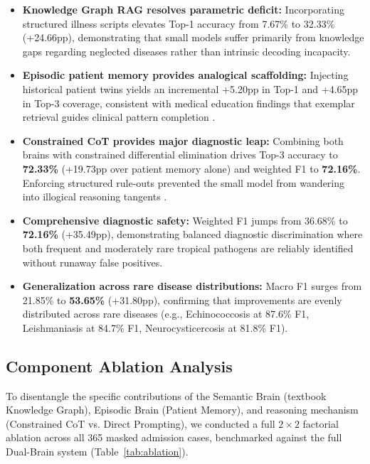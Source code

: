 \documentclass{article}
\begin{document}
\begin{itemize}[noitemsep, leftmargin=*]
    \item \textbf{Knowledge Graph RAG resolves parametric deficit:} Incorporating structured illness scripts elevates Top-1 accuracy from 7.67\% to 32.33\% (+24.66pp), demonstrating that small models suffer primarily from knowledge gaps regarding neglected diseases rather than intrinsic decoding incapacity.
    \item \textbf{Episodic patient memory provides analogical scaffolding:} Injecting historical patient twins yields an incremental +5.20pp in Top-1 and +4.65pp in Top-3 coverage, consistent with medical education findings that exemplar retrieval guides clinical pattern completion \citep{schmidt1990cognitive,bowen2006educational}.
    \item \textbf{Constrained CoT provides major diagnostic leap:} Combining both brains with constrained differential elimination drives Top-3 accuracy to \textbf{72.33\%} (+19.73pp over patient memory alone) and weighted F1 to \textbf{72.16\%}. Enforcing structured rule-outs prevented the small model from wandering into illogical reasoning tangents \citep{wei2022chain,renze2024benefits}.
    \item \textbf{Comprehensive diagnostic safety:} Weighted F1 jumps from 36.68\% to \textbf{72.16\%} (+35.49pp), demonstrating balanced diagnostic discrimination where both frequent and moderately rare tropical pathogens are reliably identified without runaway false positives.
    \item \textbf{Generalization across rare disease distributions:} Macro F1 surges from 21.85\% to \textbf{53.65\%} (+31.80pp), confirming that improvements are evenly distributed across rare diseases (e.g., Echinococcosis at 87.6\% F1, Leishmaniasis at 84.7\% F1, Neurocysticercosis at 81.8\% F1).
\end{itemize}

\subsection{Component Ablation Analysis}
\label{sec:ablation}

To disentangle the specific contributions of the Semantic Brain (textbook Knowledge Graph), Episodic Brain (Patient Memory), and reasoning mechanism (Constrained CoT vs. Direct Prompting), we conducted a full $2 \times 2$ factorial ablation across all 365 masked admission cases, benchmarked against the full Dual-Brain system (Table~\ref{tab:ablation}).
\end{document}
